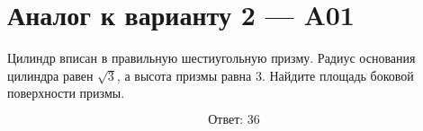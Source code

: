 \documentclass[12pt,a4paper]{article}
\begin{document}
\section*{Аналог к варианту 2 — A01}

Цилиндр вписан в правильную шестиугольную призму. Радиус основания цилиндра равен \(\sqrt3\), а высота призмы равна \(3\). Найдите площадь боковой поверхности призмы.

\begin{center}
\end{center}

\[
\boxed{\text{Ответ: }36}
\]
\end{document}
